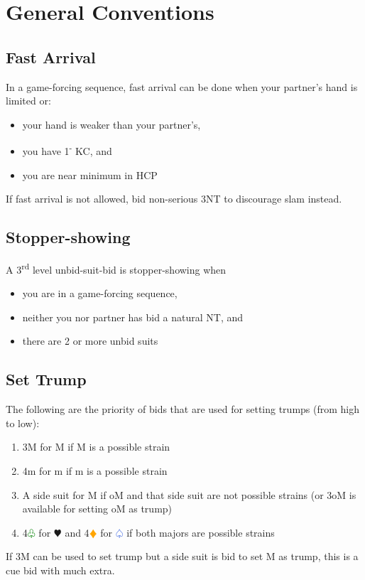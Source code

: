 \documentclass{article}
\renewcommand{\sp}{\textcolor{RoyalBlue}{$\varspade$}}
\newcommand{\he}{\textcolor{RubineRed}{$\varheart$}}
\newcommand{\di}{\textcolor{Orange}{$\vardiamond$}}
\newcommand{\cl}{\textcolor{Green}{$\varclub$}}
\newcommand{\nt}{\relsize{-1}NT\relsize{1}}
\newcommand{\down}{\textsuperscript{-}}
\begin{document}
\section{General Conventions}

\subsection{Fast Arrival}
In a game-forcing sequence, fast arrival can be done when your partner's hand is limited or:
\begin{itemize}
	\itemsep0em
	\item your hand is weaker than your partner's,
	\item you have 1\down{} KC, and
	\item you are near minimum in HCP
\end{itemize}
If fast arrival is not allowed, bid non-serious 3\nt{} to discourage slam instead.

\subsection{Stopper-showing}
A 3\textsuperscript{rd} level unbid-suit-bid is stopper-showing when
\begin{itemize}
	\itemsep0em
	\item you are in a game-forcing sequence,
	\item neither you nor partner has bid a natural \nt{}, and
	\item there are 2 or more unbid suits
\end{itemize}

\subsection{Set Trump}
The following are the priority of bids that are used for setting trumps (from high to low):
\begin{enumerate}
	\itemsep0em
	\item 3M for M if M is a possible strain
	\item 4m for m if m is a possible strain
	\item A side suit for M if oM and that side suit are not possible strains (or 3oM is available for setting oM as trump)
	\item 4\cl{} for \he{} and 4\di{} for \sp{} if both majors are possible strains
\end{enumerate}
If 3M can be used to set trump but a side suit is bid to set M as trump, this is a cue bid with much extra.
\end{document}
